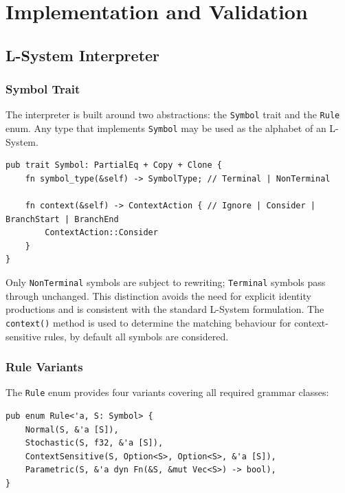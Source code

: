 \chapter{Implementation and Validation}
\label{chapter3}

\section{L-System Interpreter}
\label{sec:interpreter}

\subsection{Symbol Trait}

The interpreter is built around two abstractions: the \texttt{Symbol} trait and the \texttt{Rule} enum. Any
type that implements \texttt{Symbol} may be used as the alphabet of an L-System.

\begin{verbatim}
pub trait Symbol: PartialEq + Copy + Clone {
    fn symbol_type(&self) -> SymbolType; // Terminal | NonTerminal

    fn context(&self) -> ContextAction { // Ignore | Consider | BranchStart | BranchEnd
        ContextAction::Consider
    }
}
\end{verbatim}

Only \texttt{NonTerminal} symbols are subject to rewriting; \texttt{Terminal} symbols pass through unchanged.
This distinction avoids the need for explicit identity productions and is consistent with the standard
L-System formulation. The \texttt{context()} method is used to determine the matching behaviour for
context-sensitive rules, by default all symbols are considered.

\subsection{Rule Variants}

The \texttt{Rule} enum provides four variants covering all required grammar classes:

\begin{verbatim}
pub enum Rule<'a, S: Symbol> {
    Normal(S, &'a [S]),
    Stochastic(S, f32, &'a [S]),
    ContextSensitive(S, Option<S>, Option<S>, &'a [S]),
    Parametric(S, &'a dyn Fn(&S, &mut Vec<S>) -> bool),
}
\end{verbatim}

